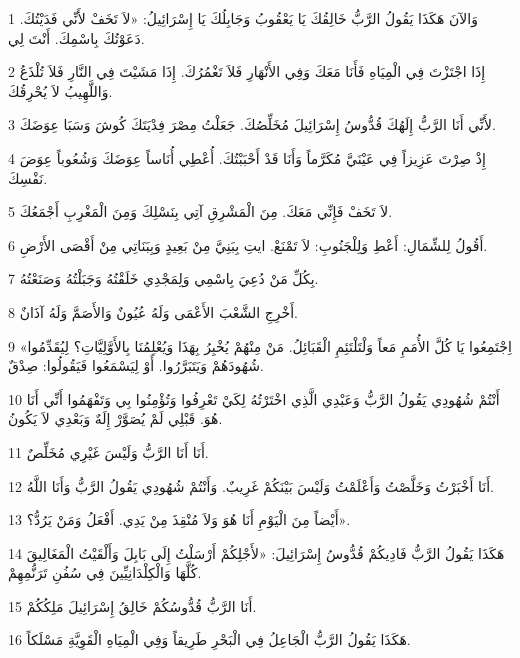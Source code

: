 \par 1 وَالآنَ هَكَذَا يَقُولُ الرَّبُّ خَالِقُكَ يَا يَعْقُوبُ وَجَابِلُكَ يَا إِسْرَائِيلُ: «لاَ تَخَفْ لأَنِّي فَدَيْتُكَ. دَعَوْتُكَ بِاسْمِكَ. أَنْتَ لِي.
\par 2 إِذَا اجْتَزْتَ فِي الْمِيَاهِ فَأَنَا مَعَكَ وَفِي الأَنْهَارِ فَلاَ تَغْمُرُكَ. إِذَا مَشَيْتَ فِي النَّارِ فَلاَ تُلْذَعُ وَاللَّهِيبُ لاَ يُحْرِقُكَ.
\par 3 لأَنِّي أَنَا الرَّبُّ إِلَهُكَ قُدُّوسُ إِسْرَائِيلَ مُخَلِّصُكَ. جَعَلْتُ مِصْرَ فِدْيَتَكَ كُوشَ وَسَبَا عِوَضَكَ.
\par 4 إِذْ صِرْتَ عَزِيزاً فِي عَيْنَيَّ مُكَرَّماً وَأَنَا قَدْ أَحْبَبْتُكَ. أُعْطِي أُنَاساً عِوَضَكَ وَشُعُوباً عِوَضَ نَفْسِكَ.
\par 5 لاَ تَخَفْ فَإِنِّي مَعَكَ. مِنَ الْمَشْرِقِ آتِي بِنَسْلِكَ وَمِنَ الْمَغْرِبِ أَجْمَعُكَ.
\par 6 أَقُولُ لِلشِّمَالِ: أَعْطِ وَلِلْجَنُوبِ: لاَ تَمْنَعْ. ايتِ بِبَنِيَّ مِنْ بَعِيدٍ وَبِبَنَاتِي مِنْ أَقْصَى الأَرْضِ.
\par 7 بِكُلِّ مَنْ دُعِيَ بِاسْمِي وَلِمَجْدِي خَلَقْتُهُ وَجَبَلْتُهُ وَصَنَعْتُهُ.
\par 8 أَخْرِجِ الشَّعْبَ الأَعْمَى وَلَهُ عُيُونٌ وَالأَصَمَّ وَلَهُ آذَانٌ.
\par 9 «اِجْتَمِعُوا يَا كُلَّ الأُمَمِ مَعاً وَلْتَلْتَئِمِ الْقَبَائِلُ. مَنْ مِنْهُمْ يُخْبِرُ بِهَذَا وَيُعْلِمُنَا بِالأَوَّلِيَّاتِ؟ لِيُقَدِّمُوا شُهُودَهُمْ وَيَتَبَرَّرُوا. أَوْ لِيَسْمَعُوا فَيَقُولُوا: صِدْقٌ.
\par 10 أَنْتُمْ شُهُودِي يَقُولُ الرَّبُّ وَعَبْدِي الَّذِي اخْتَرْتُهُ لِكَيْ تَعْرِفُوا وَتُؤْمِنُوا بِي وَتَفْهَمُوا أَنِّي أَنَا هُوَ. قَبْلِي لَمْ يُصَوَّرْ إِلَهٌ وَبَعْدِي لاَ يَكُونُ.
\par 11 أَنَا أَنَا الرَّبُّ وَلَيْسَ غَيْرِي مُخَلِّصٌ.
\par 12 أَنَا أَخْبَرْتُ وَخَلَّصْتُ وَأَعْلَمْتُ وَلَيْسَ بَيْنَكُمْ غَرِيبٌ. وَأَنْتُمْ شُهُودِي يَقُولُ الرَّبُّ وَأَنَا اللَّهُ.
\par 13 أَيْضاً مِنَ الْيَوْمِ أَنَا هُوَ وَلاَ مُنْقِذَ مِنْ يَدِي. أَفْعَلُ وَمَنْ يَرُدُّ؟».
\par 14 هَكَذَا يَقُولُ الرَّبُّ فَادِيكُمْ قُدُّوسُ إِسْرَائِيلَ: «لأَجْلِكُمْ أَرْسَلْتُ إِلَى بَابِلَ وَأَلْقَيْتُ الْمَغَالِيقَ كُلَّهَا وَالْكِلْدَانِيِّينَ فِي سُفُنِ تَرَنُّمِهِمْ.
\par 15 أَنَا الرَّبُّ قُدُّوسُكُمْ خَالِقُ إِسْرَائِيلَ مَلِكُكُمْ.
\par 16 هَكَذَا يَقُولُ الرَّبُّ الْجَاعِلُ فِي الْبَحْرِ طَرِيقاً وَفِي الْمِيَاهِ الْقَوِيَّةِ مَسْلَكاً.
